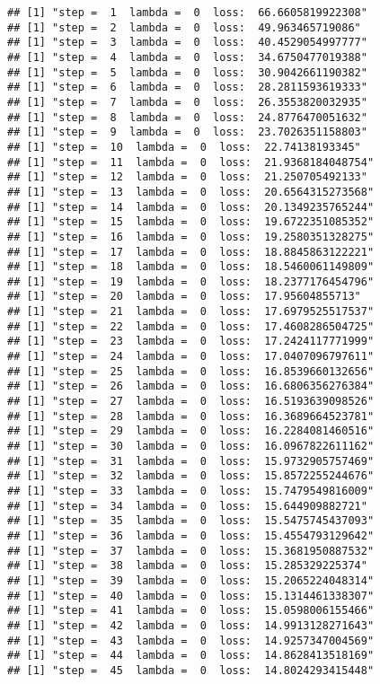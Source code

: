 \documentclass[
]{article}
\begin{document}
\begin{verbatim}
## [1] "step =  1  lambda =  0  loss:  66.6605819922308"
## [1] "step =  2  lambda =  0  loss:  49.963465719086"
## [1] "step =  3  lambda =  0  loss:  40.4529054997777"
## [1] "step =  4  lambda =  0  loss:  34.6750477019388"
## [1] "step =  5  lambda =  0  loss:  30.9042661190382"
## [1] "step =  6  lambda =  0  loss:  28.2811593619333"
## [1] "step =  7  lambda =  0  loss:  26.3553820032935"
## [1] "step =  8  lambda =  0  loss:  24.8776470051632"
## [1] "step =  9  lambda =  0  loss:  23.7026351158803"
## [1] "step =  10  lambda =  0  loss:  22.74138193345"
## [1] "step =  11  lambda =  0  loss:  21.9368184048754"
## [1] "step =  12  lambda =  0  loss:  21.250705492133"
## [1] "step =  13  lambda =  0  loss:  20.6564315273568"
## [1] "step =  14  lambda =  0  loss:  20.1349235765244"
## [1] "step =  15  lambda =  0  loss:  19.6722351085352"
## [1] "step =  16  lambda =  0  loss:  19.2580351328275"
## [1] "step =  17  lambda =  0  loss:  18.8845863122221"
## [1] "step =  18  lambda =  0  loss:  18.5460061149809"
## [1] "step =  19  lambda =  0  loss:  18.2377176454796"
## [1] "step =  20  lambda =  0  loss:  17.95604855713"
## [1] "step =  21  lambda =  0  loss:  17.6979525517537"
## [1] "step =  22  lambda =  0  loss:  17.4608286504725"
## [1] "step =  23  lambda =  0  loss:  17.2424117771999"
## [1] "step =  24  lambda =  0  loss:  17.0407096797611"
## [1] "step =  25  lambda =  0  loss:  16.8539660132656"
## [1] "step =  26  lambda =  0  loss:  16.6806356276384"
## [1] "step =  27  lambda =  0  loss:  16.5193639098526"
## [1] "step =  28  lambda =  0  loss:  16.3689664523781"
## [1] "step =  29  lambda =  0  loss:  16.2284081460516"
## [1] "step =  30  lambda =  0  loss:  16.0967822611162"
## [1] "step =  31  lambda =  0  loss:  15.9732905757469"
## [1] "step =  32  lambda =  0  loss:  15.8572255244676"
## [1] "step =  33  lambda =  0  loss:  15.7479549816009"
## [1] "step =  34  lambda =  0  loss:  15.644909882721"
## [1] "step =  35  lambda =  0  loss:  15.5475745437093"
## [1] "step =  36  lambda =  0  loss:  15.4554793129642"
## [1] "step =  37  lambda =  0  loss:  15.3681950887532"
## [1] "step =  38  lambda =  0  loss:  15.285329225374"
## [1] "step =  39  lambda =  0  loss:  15.2065224048314"
## [1] "step =  40  lambda =  0  loss:  15.1314461338307"
## [1] "step =  41  lambda =  0  loss:  15.0598006155466"
## [1] "step =  42  lambda =  0  loss:  14.9913128271643"
## [1] "step =  43  lambda =  0  loss:  14.9257347004569"
## [1] "step =  44  lambda =  0  loss:  14.8628413518169"
## [1] "step =  45  lambda =  0  loss:  14.8024293415448"

\end{verbatim}
\end{document}
